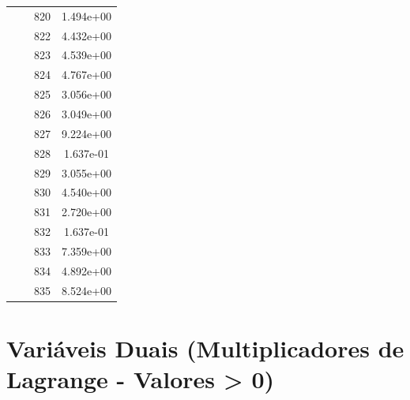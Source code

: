 \documentclass[12pt]{article}
\begin{document}
\begin{longtable}{@{}cccc@{}}
 &  & 820 & 1.494e+00 \\
 &  & 822 & 4.432e+00 \\
 &  & 823 & 4.539e+00 \\
 &  & 824 & 4.767e+00 \\
 &  & 825 & 3.056e+00 \\
 &  & 826 & 3.049e+00 \\
 &  & 827 & 9.224e+00 \\
 &  & 828 & 1.637e-01 \\
 &  & 829 & 3.055e+00 \\
 &  & 830 & 4.540e+00 \\
 &  & 831 & 2.720e+00 \\
 &  & 832 & 1.637e-01 \\
 &  & 833 & 7.359e+00 \\
 &  & 834 & 4.892e+00 \\
 &  & 835 & 8.524e+00 \\

\bottomrule
\end{longtable}


\section{Variáveis Duais (Multiplicadores de Lagrange - Valores > 0)}
\end{document}
